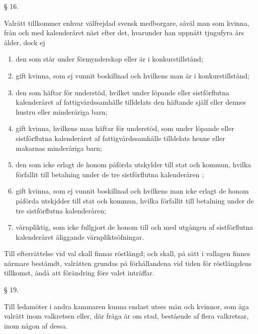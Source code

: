 \documentclass[a4paper]{article}
\renewcommand{\section}[1]{\begin{center}§ #1.\end{center}}
\begin{document}
\section{16}
Valrätt tillkommer enhvar välfrejdad svensk medborgare, såväl man som kvinna,
från och med kalenderåret näst efter det, hvarunder han uppnått tjugufyra års
ålder, dock ej
\begin{enumerate}[label=\alph*)]
        \item den som står under förmynderskap eller är i konkurstillstånd;
        \item gift kvinna, som ej vunnit boskillnad och hvilkens man är i
                konkurstillstånd;
        \item den som häftar för understöd, hvilket under löpande eller
                sistförflutna kalenderåret af fattigvårdssamhälle tilldelats
                den häftande själf eller dennes hustru eller minderåriga barn;
        \item gift kvinna, hvilkens man häftar för understöd, som under löpande
                eller sistförflutna kalenderåret af fattigvårdssamhälle
                tilldelats henne eller makarnas minderåriga barn;
        \item den som icke erlagt de honom påförda utskylder till stat och
                kommun, hvilka förfallit till betalning under de tre
                sistförflutna kalenderåren ;
        \item gift kvinna, som ej vunnit boskillnad och hvilkens man icke
                erlagt de honom påförda utskjdder till stat och kommun, hvilka
                förfallit till betalning under de tre sistförflutna
                kalenderåren;
        \item värnpliktig, som icke fullgjort de honom till och med utgången af
                sistförflutna kalenderåret åliggande värnpliktsöfningar.  
\end{enumerate}

Till efterrättelse vid val skall finnas röstlängd; och skall, på sätt i
vallagen finnes närmare bestämdt, valrätten grundas på förhållandena vid tiden
för röstlängdens tillkomst, ändå att förändring före valet inträffar.

\section{19}
Till ledamöter i andra kammaren kunna endast utses män och kvinnor, som äga
valrätt inom valkretsen eller, där fråga är om stad, bestående af flera
valkretsar, inom någon af dessa.
\end{document}
